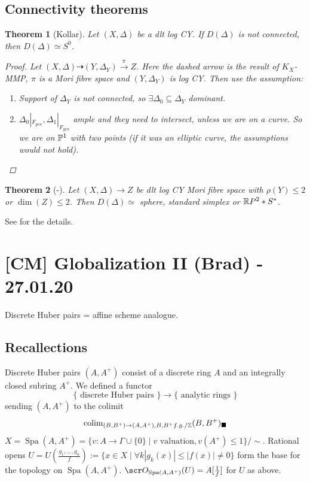 \documentclass[A4paper, british, reqno]{amsart}
\theoremstyle{darkgreentheorem}
\newtheorem{thm}{Theorem}[section]
\theoremstyle{darkbluedefinition}
\theoremstyle{darkredexample}
\theoremstyle{remark}
\DeclareMathOperator{\Spa}{Spa}
\newcommand{\1}{\mathbbm{1}}
\newcommand{\sub}{\subseteq}
\newcommand{\usolid}{_{\blacksquare}}
\begin{document}
\subsection{Connectivity theorems}
\begin{thm}[Kollar]
    Let $(X,\Delta)$ be a dlt log CY.
    If $D(\Delta)$ is not connected, then $D(\Delta)\simeq S^{0}$.
    \begin{proof}
	Let $(X,\Delta)\dashrightarrow (Y,\Delta_{Y})\xrightarrow{\pi} Z$.
	Here the dashed arrow is the result of $K_{X}$-MMP, $\pi$ is a Mori fibre space and $(Y,\Delta_{Y})$ is log CY.
	Then use the assumption:
	\begin{enumerate}
	    \item Support of $\Delta_{Y}$ is not connected, so $\exists \Delta_{0}\sub \Delta_{Y}$ dominant.
	    \item $\Delta_{0}|_{F_{gen}},\Delta_{1}|_{F_{gen}}$ ample and they need to intersect, unless we are on a curve.
		So we are on $\P^{1}$ with two points (if it was an elliptic curve, the assumptions would not hold).
	\end{enumerate}
    \end{proof}
\end{thm}

\begin{thm}[-]
    Let $(X,\Delta)\to Z$ be dlt log CY Mori fibre space with $\rho(Y)\leqslant 2$ or $\dim(Z)\leqslant 2$.
    Then $D(\Delta)\simeq $ sphere, standard simplex or $\R P^{2} *S^{*}$.
\end{thm}

See \cite{mau18} for the details.

\section{[CM] Globalization II (Brad) - 27.01.20}

Discrete Huber pairs = affine scheme analogue.

\subsection{Recallections}

Discrete Huber pairs $(A,A^{+})$ consist of a discrete ring $A$ and an integrally closed subring $A^{+}$.
We defined a functor
\[ \{\text{ discrete Huber pairs }\}\to \{ \text{ analytic rings }\} \]
sending $(A,A^{+})$ to the colimit
\[ \operatorname{colim}_{(B,B^{+})\to (A,A^{+}),B,B^{+} f.g./\Z}(B,B^{+})\usolid \]
$X=\Spa(A,A^{+})=\{ v\colon A\to \Gamma\cup\{0\}\mid v \text{ valuation}, v(A^{+})\leqslant 1\}/\sim$.
Rational opens $U=U(\frac{g_{1},\ldots,g_{n}}{f}):=\{x\in X\mid \forall k |g_{k}(x)|\leqslant |f(x)|\neq 0 \}$ form the base for the topology on $\Spa(A,A^{+})$.
$\O_{\Spa(A,A^{+})}(U)=A[\frac{1}{f}]$ for $U$ as above.
\end{document}
